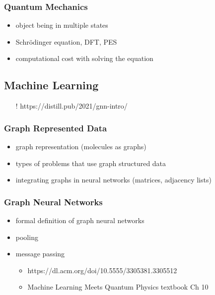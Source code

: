 \documentclass[12pt]{scrartcl}
\begin{document}
\subsubsection{Quantum Mechanics}
\begin{itemize}
    \item object being in multiple states
    \item Schrödinger equation, DFT, PES
    \item computational cost with solving the equation
\end{itemize}

\newpage


\subsection{Machine Learning}
\begin{itemize}
    \item[!] https://distill.pub/2021/gnn-intro/
\end{itemize}
\subsubsection{Graph Represented Data}
\begin{itemize}
    \item graph representation (molecules as graphs)
    \item types of problems that use graph structured data 
    \item integrating graphs in neural networks (matrices, adjacency lists)
\end{itemize}
\subsubsection{Graph Neural Networks}    
\begin{itemize}
    \item formal definition of graph neural networks
    \item pooling
    \item message passing
    \begin{itemize}
        \item https://dl.acm.org/doi/10.5555/3305381.3305512
        \item Machine Learning Meets Quantum Physics textbook Ch 10
    \end{itemize}
\end{itemize}

  
\end{document}
